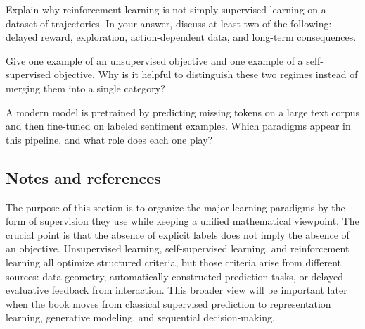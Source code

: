 \begin{exercise}
Explain why reinforcement learning is not simply supervised learning on a dataset of trajectories. In your answer, discuss at least two of the following: delayed reward, exploration, action-dependent data, and long-term consequences.
\end{exercise}

\begin{exercise}
Give one example of an unsupervised objective and one example of a self-supervised objective. Why is it helpful to distinguish these two regimes instead of merging them into a single category?
\end{exercise}

\begin{exercise}
A modern model is pretrained by predicting missing tokens on a large text corpus and then fine-tuned on labeled sentiment examples. Which paradigms appear in this pipeline, and what role does each one play?
\end{exercise}

\subsection*{Notes and references}

The purpose of this section is to organize the major learning paradigms by the form of supervision they use while keeping a unified mathematical viewpoint. The crucial point is that the absence of explicit labels does not imply the absence of an objective. Unsupervised learning, self-supervised learning, and reinforcement learning all optimize structured criteria, but those criteria arise from different sources: data geometry, automatically constructed prediction tasks, or delayed evaluative feedback from interaction. This broader view will be important later when the book moves from classical supervised prediction to representation learning, generative modeling, and sequential decision-making.